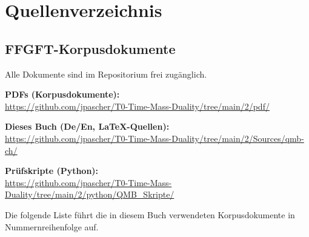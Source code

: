 \chapter*{Quellenverzeichnis}

\section*{FFGFT-Korpusdokumente}

Alle Dokumente sind im Repositorium frei zugänglich.

\medskip\noindent\textbf{PDFs (Korpusdokumente):}\\
\url{https://github.com/jpascher/T0-Time-Mass-Duality/tree/main/2/pdf/}

\medskip\noindent\textbf{Dieses Buch (De/En, LaTeX-Quellen):}\\
\url{https://github.com/jpascher/T0-Time-Mass-Duality/tree/main/2/Sources/qmb-ch/}

\medskip\noindent\textbf{Prüfskripte (Python):}\\
\url{https://github.com/jpascher/T0-Time-Mass-Duality/tree/main/2/python/QMB_Skripte/}

\medskip\noindent Die folgende Liste führt die in diesem Buch verwendeten
Korpusdokumente in Nummernreihenfolge auf.


